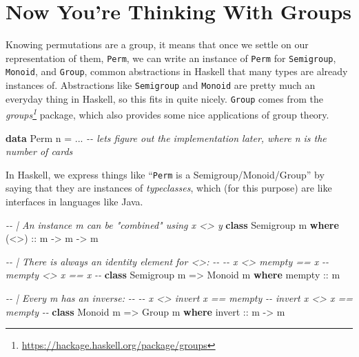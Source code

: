 \documentclass[]{article}
\newenvironment{Shaded}{}{}
\newcommand{\CommentTok}[1]{\textcolor[rgb]{0.38,0.63,0.69}{\textit{#1}}}
\newcommand{\DataTypeTok}[1]{\textcolor[rgb]{0.56,0.13,0.00}{#1}}
\newcommand{\KeywordTok}[1]{\textcolor[rgb]{0.00,0.44,0.13}{\textbf{#1}}}
\newcommand{\NormalTok}[1]{#1}
\newcommand{\OperatorTok}[1]{\textcolor[rgb]{0.40,0.40,0.40}{#1}}
\newcommand{\OtherTok}[1]{\textcolor[rgb]{0.00,0.44,0.13}{#1}}
\renewcommand{\href}[2]{#2\footnote{\url{#1}}}
\begin{document}
\hypertarget{now-youre-thinking-with-groups}{%
\section{Now You're Thinking With Groups}\label{now-youre-thinking-with-groups}}

Knowing permutations are a group, it means that once we settle on our
representation of them, \texttt{Perm}, we can write an instance of \texttt{Perm}
for \texttt{Semigroup}, \texttt{Monoid}, and \texttt{Group}, common abstractions
in Haskell that many types are already instances of. Abstractions like
\texttt{Semigroup} and \texttt{Monoid} are pretty much an everyday thing in
Haskell, so this fits in quite nicely. \texttt{Group} comes from the
\emph{\href{https://hackage.haskell.org/package/groups}{groups}} package, which
also provides some nice applications of group theory.

\begin{Shaded}
\begin{Highlighting}[]
\KeywordTok{data} \DataTypeTok{Perm}\NormalTok{ n }\OtherTok{=} \OperatorTok{...} \CommentTok{{-}{-} let\textquotesingle{}s figure out the implementation later, where n is the number of cards}
\end{Highlighting}
\end{Shaded}

In Haskell, we express things like ``\texttt{Perm} is a Semigroup/Monoid/Group''
by saying that they are instances of \emph{typeclasses}, which (for this
purpose) are like interfaces in languages like Java.

\begin{Shaded}
\begin{Highlighting}[]
\CommentTok{{-}{-} | An instance m can be "combined" using \textasciigrave{}x <> y\textasciigrave{}}
\KeywordTok{class} \DataTypeTok{Semigroup}\NormalTok{ m }\KeywordTok{where}
\OtherTok{    (<>) ::}\NormalTok{ m }\OtherTok{{-}>}\NormalTok{ m }\OtherTok{{-}>}\NormalTok{ m}

\CommentTok{{-}{-} | There is always an identity element for <>:}
\CommentTok{{-}{-}}
\CommentTok{{-}{-} x <> mempty == x}
\CommentTok{{-}{-} mempty <> x == x}
\CommentTok{{-}{-}}
\KeywordTok{class} \DataTypeTok{Semigroup}\NormalTok{ m }\OtherTok{=>} \DataTypeTok{Monoid}\NormalTok{ m }\KeywordTok{where}
\OtherTok{    mempty ::}\NormalTok{ m}

\CommentTok{{-}{-} | Every m has an inverse:}
\CommentTok{{-}{-}}
\CommentTok{{-}{-} x <> invert x == mempty}
\CommentTok{{-}{-} invert x <> x == mempty}
\CommentTok{{-}{-}}
\KeywordTok{class} \DataTypeTok{Monoid}\NormalTok{ m }\OtherTok{=>} \DataTypeTok{Group}\NormalTok{ m }\KeywordTok{where}
\OtherTok{    invert ::}\NormalTok{ m }\OtherTok{{-}>}\NormalTok{ m}
\end{Highlighting}
\end{Shaded}
\end{document}

